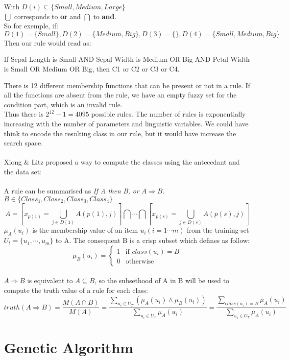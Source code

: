\documentclass[a4paper,12pt]{article}
\begin{document}
With $D(i)\subseteq\{Small,Medium,Large\}$ \\
$\bigcup$ corresponds to \textbf{or} and $\bigcap$ to \textbf{and}.\\
So for exemple, if:
\[D(1)=\{Small\},D(2)=\{Medium,Big\},D(3)=\{\},D(4)=\{Small,Medium,Big\}\]
Then our rule would read as:
\begin{center}If Sepal Length is Small AND Sepal Width is Medium OR Big AND Petal Width is Small OR Medium OR Big, then C1 or C2 or C3 or C4.\end{center} 
There is 12 different membership functions that can be present or not in a rule. If all the functions are absent from the rule, we have an empty fuzzy set for the condition part, which is an invalid rule.\\
Thus there is $2^{12}-1=4095$ possible rules. The number of rules is exponentially increasing with the number of parameters and linguistic variables. We could have think to encode the resulting class in our rule, but it would have increase the search space. \\ 
\\
Xiong \& Litz proposed a way to compute the classes using the antecedant and the data set: \\
\\
A rule can be summarised as \textit{If A then B, or $A\Rightarrow B$}.\\
$B\in \{Class_1,Class_2,Class_3,Class_4\}$\\
\[A=[x_{p(1)}=\bigcup_{j\in D(1)}A(p(1),j) ] \bigcap\cdots\bigcap[x_{p(s)}=\bigcup_{j\in D(s)}A(p(s),j)]\]
$\mu_A(u_i)$ is the membership value of an item $u_i(i=1\cdots m)$ from the training set $U_t=\{u_1,\cdots ,u_m\}$ to A.
The consequent B is a crisp subset which defines as follow:
\[\mu_B(u_i)=
\begin{cases}
	1 & \text{if $class(u_i)=B$}\\
	0 & \text{otherwise}
\end{cases}\]
\\
$A\Rightarrow B$ is equivalent to $A\subseteq B$, so the subsethood of A in B will be used to compute the truth value of a rule for each class:
\[
	truth(A\Rightarrow B)=
	\frac{M(A\cap B)}{M(A)}=
	\frac
		{\sum\limits_{u_i\in U_T}{(\mu_A(u_i)\land \mu_B(u_i))}}
		{\sum\limits_{u_i\in U_T}{\mu_A(u_i)}}=
	\frac
		{\sum\limits_{class(u_i)=B}{\mu_A(u_i)}}
		{\sum\limits_{u_i\in U_T}{\mu_A(u_i)}}
\]

\section{Genetic Algorithm}
\end{document}

